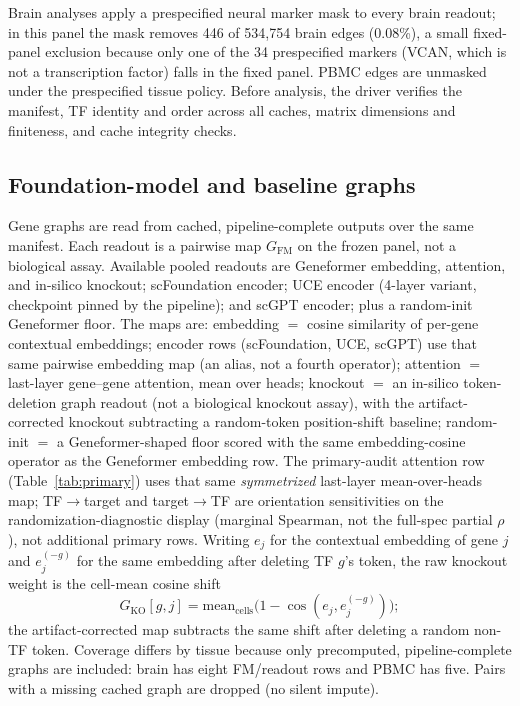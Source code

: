 \documentclass[fleqn,10pt,lineno]{wlpeerj}
\begin{document}
Brain analyses apply a prespecified neural marker mask to every brain readout; in this panel the
mask removes 446 of 534{,}754 brain edges (0.08\%), a small fixed-panel exclusion because only one
of the 34 prespecified markers (VCAN, which is not a transcription factor) falls in the fixed panel. PBMC edges are unmasked under
the prespecified tissue policy. Before
analysis, the driver verifies the manifest, TF identity and order across all caches, matrix dimensions
and finiteness, and cache integrity checks.

\subsection{Foundation-model and baseline graphs}
Gene graphs are read from cached, pipeline-complete outputs over the same manifest. Each readout is
a pairwise map $G_{\mathrm{FM}}$ on the frozen panel, not a biological assay. Available pooled
readouts are Geneformer embedding, attention, and in-silico knockout; scFoundation encoder; UCE
encoder (4-layer variant, checkpoint pinned by the pipeline); and scGPT encoder; plus a
random-init Geneformer floor. The maps are:
embedding $=$ cosine similarity of per-gene contextual embeddings;
encoder rows (scFoundation, UCE, scGPT) use that same pairwise embedding map (an alias, not a
fourth operator);
attention $=$ last-layer gene--gene attention, mean over heads;
knockout $=$ an in-silico token-deletion graph readout (not a biological knockout assay), with the
artifact-corrected knockout subtracting a random-token position-shift baseline;
random-init $=$ a Geneformer-shaped floor scored with the same embedding-cosine operator as the
Geneformer embedding row.
The primary-audit attention row (Table~\ref{tab:primary}) uses that same
\emph{symmetrized} last-layer mean-over-heads map; TF$\to$target and
target$\to$TF are orientation sensitivities on the randomization-diagnostic display (marginal
Spearman, not the full-spec partial $\rho$), not additional primary rows.
Writing $e_j$ for the contextual embedding of gene $j$ and $e_j^{(-g)}$ for the same embedding
after deleting TF $g$'s token, the raw knockout weight is the cell-mean cosine shift
\[
G_{\mathrm{KO}}[g,j]
=
\mathrm{mean}_{\mathrm{cells}}
\bigl(1-\cos(e_j,e_j^{(-g)})\bigr);
\]
the artifact-corrected map subtracts the same shift after deleting a random non-TF token.
Coverage differs by tissue because
only precomputed, pipeline-complete graphs are included: brain has eight FM/readout rows and PBMC has five.
Pairs with a missing cached graph are dropped (no silent impute).
\end{document}
